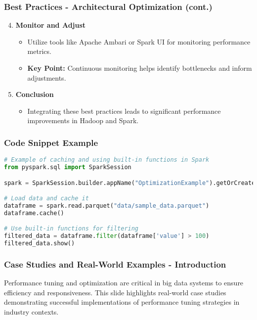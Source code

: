 \documentclass[aspectratio=169]{beamer}
\begin{document}
\begin{frame}[fragile]
    \frametitle{Best Practices - Architectural Optimization (cont.)}
    \begin{enumerate}
        \setcounter{enumi}{3}
        \item \textbf{Monitor and Adjust}
        \begin{itemize}
            \item Utilize tools like Apache Ambari or Spark UI for monitoring performance metrics.
            \item \textbf{Key Point:} Continuous monitoring helps identify bottlenecks and inform adjustments.
        \end{itemize}

        \item \textbf{Conclusion}
        \begin{itemize}
            \item Integrating these best practices leads to significant performance improvements in Hadoop and Spark.
        \end{itemize}
    \end{enumerate}
\end{frame}

\begin{frame}[fragile]
    \frametitle{Code Snippet Example}
    \begin{lstlisting}[language=Python]
# Example of caching and using built-in functions in Spark
from pyspark.sql import SparkSession

spark = SparkSession.builder.appName("OptimizationExample").getOrCreate()

# Load data and cache it
dataframe = spark.read.parquet("data/sample_data.parquet")
dataframe.cache()

# Use built-in functions for filtering
filtered_data = dataframe.filter(dataframe['value'] > 100)
filtered_data.show()
    \end{lstlisting}
\end{frame}

\begin{frame}[fragile]
    \frametitle{Case Studies and Real-World Examples - Introduction}
    Performance tuning and optimization are critical in big data systems to ensure efficiency and responsiveness. This slide highlights real-world case studies demonstrating successful implementations of performance tuning strategies in industry contexts.
\end{frame}
\end{document}
